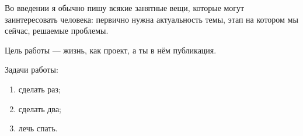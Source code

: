 
Во введении я обычно пишу всякие занятные вещи, которые могут заинтересовать человека: первично нужна актуальность темы, этап на котором мы сейчас,
решаемые проблемы.

Цель работы — жизнь, как проект, а ты в нём публикация.

Задачи работы:
\begin{enumerate}[label=\arabic*)]
  \item сделать раз;
  \item сделать два;
  \item лечь спать.
\end{enumerate}

